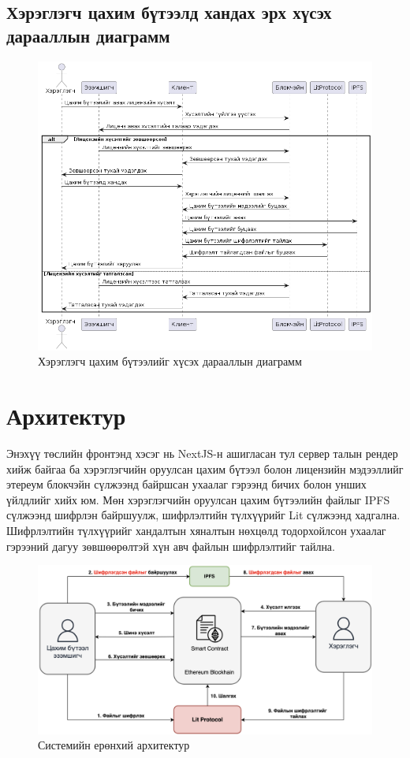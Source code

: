 \subsection{Хэрэглэгч цахим бүтээлд хандах эрх хүсэх дарааллын диаграмм}
\begin{figure}[h!]
	\centering
	\includegraphics[scale=0.6, angle=90]{src/images/sequence-2.png}
	\caption{Хэрэглэгч цахим бүтээлийг хүсэх дарааллын диаграмм}
\end{figure}

\newpage
\section{Архитектур}
Энэхүү төслийн фронтэнд хэсэг нь NextJS-н ашигласан тул сервер талын рендер хийж байгаа ба хэрэглэгчийн оруулсан цахим бүтээл болон лицензийн мэдээллийг этереум блокчэйн сүлжээнд байршсан ухаалаг гэрээнд бичих болон унших үйлдлийг хийх юм. Мөн хэрэглэгчийн оруулсан цахим бүтээлийн файлыг IPFS сүлжээнд шифрлэн байршуулж, шифрлэлтийн түлхүүрийг Lit сүлжээнд хадгална. Шифрлэлтийн түлхүүрийг хандалтын хяналтын нөхцөлд тодорхойлсон ухаалаг гэрээний дагуу зөвшөөрөлтэй хүн авч файлын шифрлэлтийг тайлна.


\begin{figure}[h!]
	\centering
	\includegraphics[scale=0.26]{src/images/architecture.png}
	\caption{Системийн ерөнхий архитектур}
\end{figure}
